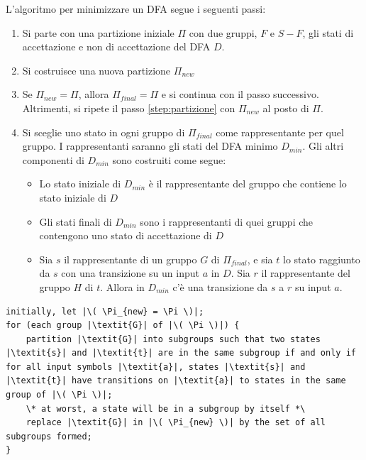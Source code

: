 \documentclass[a4paper]{article}
\begin{document}
\vspace{1em}
\noindent
L'algoritmo per minimizzare un DFA segue i seguenti passi:
\begin{enumerate}
  \item Si parte con una partizione iniziale \( \Pi \) con due gruppi, \( F \) e \( S - F \), gli
    stati di accettazione e non di accettazione del DFA \( D \).

  \item \label{step:partizione}
    Si costruisce una nuova partizione \( \Pi_{new} \) 

  \item Se \( \Pi_{new} = \Pi \), allora \( \Pi_{final} = \Pi \) e si continua con il
    passo successivo. Altrimenti, si ripete il passo \ref{step:partizione} con
    \( \Pi_{new} \) al posto di \( \Pi \).

  \item Si sceglie uno stato in ogni gruppo di \( \Pi_{final} \) come rappresentante
    per quel gruppo. I rappresentanti saranno gli stati del DFA minimo \( D_{min} \).
    Gli altri componenti di \( D_{min} \) sono costruiti come segue:
    \begin{itemize}
      \item Lo stato iniziale di \( D_{min} \) è il rappresentante del gruppo che
        contiene lo stato iniziale di \( D \)

      \item Gli stati finali di \( D_{min} \) sono i rappresentanti di quei gruppi che
        contengono uno stato di accettazione di \( D \)

      \item Sia \( s \) il rappresentante di un gruppo \( G \) di \( \Pi_{final} \), e
        sia \( t \) lo stato raggiunto da \( s \) con una transizione su un input \( a \)
        in \( D \). Sia \( r \) il rappresentante del gruppo \( H \) di \( t \). Allora
        in \( D_{min} \) c'è una transizione da \( s \) a \( r \) su input \( a \).
    \end{itemize}
\end{enumerate}
\begin{lstlisting}[escapechar=|, basicstyle=\rmfamily, columns=fullflexible, keepspaces=true]
initially, let |\( \Pi_{new} = \Pi \)|;
for (each group |\textit{G}| of |\( \Pi \)|) {
    partition |\textit{G}| into subgroups such that two states |\textit{s}| and |\textit{t}| are in the same subgroup if and only if for all input symbols |\textit{a}|, states |\textit{s}| and |\textit{t}| have transitions on |\textit{a}| to states in the same group of |\( \Pi \)|;
    \* at worst, a state will be in a subgroup by itself *\
    replace |\textit{G}| in |\( \Pi_{new} \)| by the set of all subgroups formed;
}
\end{lstlisting}
\end{document}
